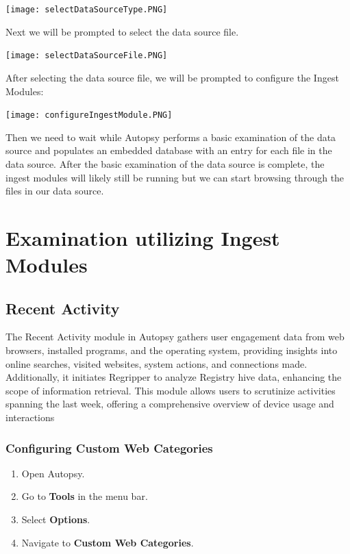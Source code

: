 \documentclass{extarticle}
\begin{document}
\begin{center}
    \texttt{[image: selectDataSourceType.PNG]}
\end{center}

Next we will be prompted to select the data source file. 

\begin{center}
    \texttt{[image: selectDataSourceFile.PNG]}
\end{center}

After selecting the data source file, we will be prompted to configure the Ingest Modules:

\begin{center}
    \texttt{[image: configureIngestModule.PNG]}
\end{center}

Then we need to wait while Autopsy performs a basic examination of the data source and populates an embedded database with an entry for each file in the data source.
After the basic examination of the data source is complete, the ingest modules will likely still be running but we can start browsing through the files in our data source.

\section{Examination utilizing Ingest Modules}

\subsection{Recent Activity}
The Recent Activity module in Autopsy gathers user engagement data from web browsers, installed programs, and the operating system, providing insights into online searches, visited websites, system actions, and connections made. Additionally, it initiates Regripper to analyze Registry hive data, enhancing the scope of information retrieval. This module allows users to scrutinize activities spanning the last week, offering a comprehensive overview of device usage and interactions

\subsubsection*{Configuring Custom Web Categories}
\begin{enumerate}
  \item Open Autopsy.
  \item Go to \textbf{Tools} in the menu bar.
  \item Select \textbf{Options}.
  \item Navigate to \textbf{Custom Web Categories}.
\end{enumerate}
\end{document}
